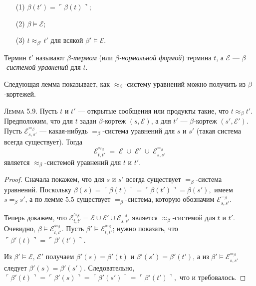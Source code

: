 \begin{enumerate}\itemsep0pt
\item[(1)] $\beta(t')=\ulcorner\beta(t)\urcorner$;
\item[(2)] $\beta\models\mathcal E$;
\item[(3)] $t\approx_{\beta'} t'$ для всякой $\beta'\models\mathcal E$.
\end{enumerate}

Термин $t'$ называют \emph{$\beta$-термом}
(или \emph{$\beta$-нормальной формой}) термина $t$,
а $\mathcal E$ — \emph{$\beta$-системой уравнений} для $t$.

\medskip
Следующая лемма показывает, как
$\approx_{\beta}$-систему уравнений можно получить из $\beta$-кортежей.

\textsc{Лемма 5.9.}
Пусть $t$ и $t'$ — открытые сообщения или продукты такие, что
$t\approx_{\beta} t'$.
Предположим, что для $t$ задан $\beta$-кортеж $(s,\mathcal E)$,
а для $t'$ — $\beta$-кортеж $(s',\mathcal E')$.
Пусть $\mathcal E_{s,s'}^{=_{\beta}}$ — какая-нибудь
$=_{\beta}$-система уравнений для $s$ и $s'$ 
(такая система всегда существует).
Тогда
\[
  \mathcal E^{\approx_{\beta}}_{t,t'}
      \;=\;
      \mathcal E\;\cup\;\mathcal E'\;\cup\;\mathcal E_{s,s'}^{=_{\beta}}
\]
является $\approx_{\beta}$-системой уравнений для $t$ и $t'$.

\begin{proof}
Сначала покажем, что для $s$ и $s'$ всегда существует
$=_{\beta}$-система уравнений.
Поскольку
\(
  \beta(s)=\ulcorner\beta(t)\urcorner
          =\ulcorner\beta(t')\urcorner
          =\beta(s'),
\)
имеем $s =_{\beta} s'$, а по лемме 5.5 существует
$=_{\beta}$-система, которую обозначим
$\mathcal E^{=_{\beta}}_{s,s'}$.

Теперь докажем, что
$\mathcal E^{\approx_{\beta}}_{t,t'}
      =\mathcal E\cup\mathcal E'\cup\mathcal E^{=_{\beta}}_{s,s'}$
является $\approx_{\beta}$-системой для $t$ и $t'$.
Очевидно, $\beta\models\mathcal E^{\approx_{\beta}}_{t,t'}$.
Пусть $\beta'\models\mathcal E^{\approx_{\beta}}_{t,t'}$;
нужно показать, что
$\ulcorner\beta'(t)\urcorner=\ulcorner\beta'(t')\urcorner$.

Из $\beta'\models\mathcal E,\,\mathcal E'$ получаем
$\beta'(s)=\beta'(t)$ и $\beta'(s')=\beta'(t')$,
а из $\beta'\models\mathcal E^{=_{\beta}}_{s,s'}$ следует
$\beta'(s)=\beta'(s')$.
Следовательно,
\(
  \ulcorner\beta'(t)\urcorner
  =\ulcorner\beta'(s)\urcorner
  =\ulcorner\beta'(s')\urcorner
  =\ulcorner\beta'(t')\urcorner,
\)
что и требовалось.
\end{proof}

